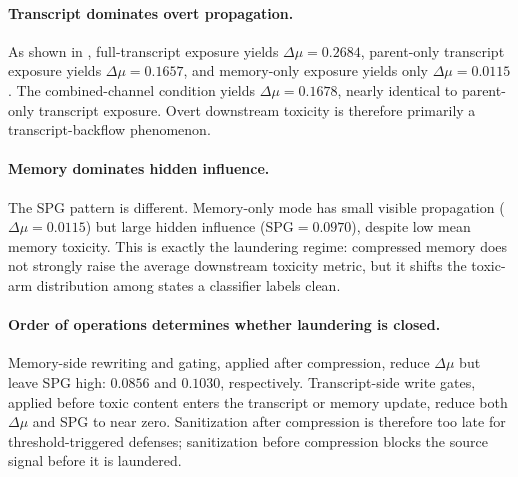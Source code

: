 \paragraph{Transcript dominates overt propagation.}
As shown in , full-transcript exposure yields $\Delta\mu=0.2684$, parent-only transcript exposure yields $\Delta\mu=0.1657$, and memory-only exposure yields only $\Delta\mu=0.0115$. The combined-channel condition yields $\Delta\mu=0.1678$, nearly identical to parent-only transcript exposure. Overt downstream toxicity is therefore primarily a transcript-backflow phenomenon.

\paragraph{Memory dominates hidden influence.}
The SPG pattern is different. Memory-only mode has small visible propagation ($\Delta\mu=0.0115$) but large hidden influence ($\mathrm{SPG}=0.0970$), despite low mean memory toxicity. This is exactly the laundering regime: compressed memory does not strongly raise the average downstream toxicity metric, but it shifts the toxic-arm distribution among states a classifier labels clean.

\paragraph{Order of operations determines whether laundering is closed.}
Memory-side rewriting and gating, applied after compression, reduce $\Delta\mu$ but leave SPG high: $0.0856$ and $0.1030$, respectively. Transcript-side write gates, applied before toxic content enters the transcript or memory update, reduce both $\Delta\mu$ and SPG to near zero. Sanitization after compression is therefore too late for threshold-triggered defenses; sanitization before compression blocks the source signal before it is laundered.

